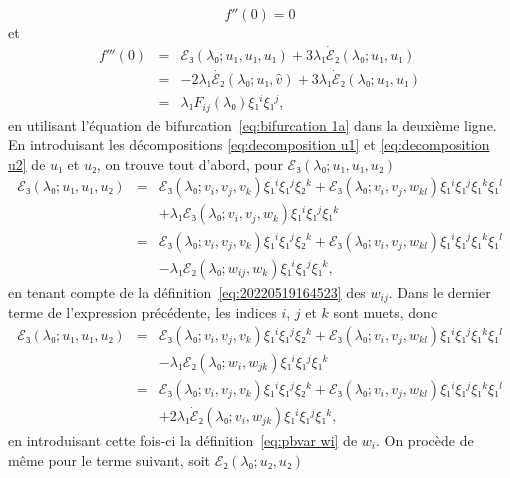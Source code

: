 \documentclass[12pt, final]{amsart}
\theoremstyle{definition}
\begin{document}
\begin{equation}
 \label{eq:DL energie derivee 2nde} f''(0) = 0
\end{equation}
et
\begin{eqnarray}
 f'''(0) & = & ℰ₃(λ₀ ; u₁, u₁, u₁) + 3 λ₁
 \dot{ℰ}₂(λ₀ ; u₁, u₁) \nonumber\\
 & = & - 2 λ₁ \dot{ℰ₂}(λ₀ ; u₁, \hat{v}) + 3
 λ₁ \dot{ℰ}₂(λ₀ ; u₁, u₁) \nonumber\\
 & = & λ₁ F_{i j}(λ₀) ξ₁^i ξ₁^j, \label{eq:DL
 energie derivee 3ieme}
\end{eqnarray}
en utilisant l'équation de bifurcation~\eqref{eq:bifurcation 1a} dans la deuxième ligne. En introduisant les décompositions \eqref{eq:decomposition u1} et \eqref{eq:decomposition u2} de \(u₁\) et \(u₂\), on trouve tout d'abord, pour \(ℰ₃(λ₀ ; u₁, u₁, u₂)\)
\begin{eqnarray*}
 ℰ₃(λ₀ ; u₁, u₁, u₂) & = & ℰ₃(λ₀ ;
 v_i, v_j, v_k) ξ₁^i ξ₁^j ξ₂^k +ℰ₃(λ₀ ; v_i, v_j,
 w_{k l}) ξ₁^i ξ₁^j ξ₁^k ξ₁^l\\
 & & + λ₁ ℰ₃(λ₀ ; v_i, v_j, w_k)
 ξ₁^i ξ₁^j ξ₁^k\\
 & = & ℰ₃(λ₀ ; v_i, v_j, v_k) ξ₁^i ξ₁^j ξ₂^k
 +ℰ₃(λ₀ ; v_i, v_j, w_{k l}) ξ₁^i ξ₁^j
 ξ₁^k ξ₁^l\\
 & & - λ₁ ℰ₂(λ₀ ; w_{i j},
 w_k) ξ₁^i ξ₁^j ξ₁^k,
\end{eqnarray*}
en tenant compte de la définition~\eqref{eq:20220519164523} des \(w_{i j}\). Dans le dernier terme de l'expression précédente, les indices \(i\), \(j\) et \(k\) sont muets, donc
\begin{eqnarray*}
 ℰ₃(λ₀ ; u₁, u₁, u₂) & = & ℰ₃(λ₀ ;
 v_i, v_j, v_k) ξ₁^i ξ₁^j ξ₂^k +ℰ₃(λ₀ ; v_i, v_j,
 w_{k l}) ξ₁^i ξ₁^j ξ₁^k ξ₁^l\\
 & & - λ₁ ℰ₂(λ₀ ; w_{i }, w_{j
  k}) ξ₁^i ξ₁^j ξ₁^k\\
 & = & ℰ₃(λ₀ ; v_i, v_j, v_k) ξ₁^i ξ₁^j ξ₂^k
 +ℰ₃(λ₀ ; v_i, v_j, w_{k l}) ξ₁^i ξ₁^j
 ξ₁^k ξ₁^l\\
 & & + 2 λ₁ \dot{ℰ}₂(λ₀ ; v_{i
 }, w_{j k}) ξ₁^i ξ₁^j ξ₁^k,
\end{eqnarray*}
en introduisant cette fois-ci la définition~\eqref{eq:pbvar wi} de \(w_i .\) On procède de même pour le terme suivant, soit \(ℰ₂(λ₀ ; u₂, u₂)\)
\end{document}
